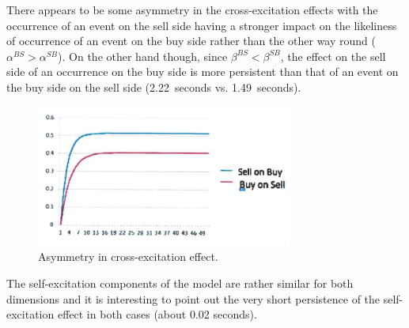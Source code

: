 	
There appears to be some asymmetry in the cross-excitation effects with the occurrence of an event on the sell side having a stronger impact on the likeliness of occurrence of an event on the buy side rather than the other way round ($\alpha^{BS} > \alpha^{SB}$). On the other hand though, since $\beta^{BS} < \beta^{SB}$, the effect on the sell side of an occurrence on the buy side is more persistent than that of an event on the buy side on the sell side (2.22~seconds vs. 1.49~seconds).
	\begin{figure}[!ht]
   	\centering
   	\includegraphics[width=0.75\textwidth]{chapters/chapter_trade_data_models/figures/asymcross.png} 
   	\caption{Asymmetry in cross-excitation effect. \label{fig:asymcross}}
	\end{figure}
The self-excitation components of the model are rather similar for both dimensions and it is interesting to point out the very short persistence of the self-excitation effect in both cases (about 0.02 seconds).


